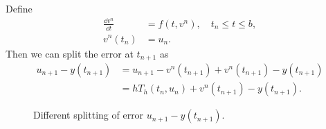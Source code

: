 \documentclass[10pt]{amsart}
\begin{document}
Define
\begin{equation}\label{eq:vn}
\begin{aligned}
\frac{\dd v^n}{\dd t} &= f(t, v^n), \quad t_n \leq t \leq b, \\
v^n(t_n) &= u_n.
\end{aligned}
\end{equation}
Then we can split the error at $t_{n+1}$ as
$$
\begin{aligned}
u_{n+1} - y(t_{n+1}) &= u_{n+1} - v^n(t_{n+1}) + v^n(t_{n+1}) - y(t_{n+1}) \\
&= h T_h(t_n, u_n) + v^n(t_{n+1}) - y(t_{n+1}).
\end{aligned}
$$
\begin{figure}[htbp]
\label{fig:}
\caption{Different splitting of error $u_{n+1} -y(t_{n+1})$.}
\end{figure}
\end{document}
